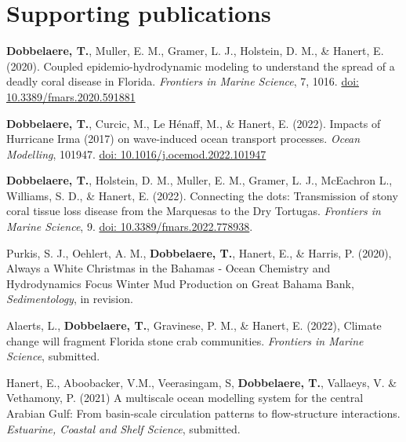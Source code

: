 \newpage
\section*{Supporting publications}

\begin{list}{}{%
    \setlength{\topsep}{0pt}%
    \setlength{\leftmargin}{0.23in}%
    \setlength{\listparindent}{-0.23in}%
    \setlength{\itemindent}{-0.23in}%
    \setlength{\parsep}{\parskip}%
    }%
        
    \item \textbf{Dobbelaere, T.}, Muller, E. M., Gramer, L. J., Holstein, D. M., \& Hanert, E.
    (2020). Coupled epidemio-hydrodynamic modeling to understand the spread
    of a deadly coral disease in Florida. \textit{Frontiers in Marine Science}, 7, 1016. \href{https://www.frontiersin.org/articles/10.3389/fmars.2020.591881/full}{doi: 10.3389/fmars.2020.591881}
    
    \item \textbf{Dobbelaere, T.}, Curcic, M., Le Hénaff, M., \& Hanert, E. (2022). Impacts of Hurricane Irma (2017) on wave-induced ocean transport processes. \textit{Ocean Modelling}, 101947. \href{https://www.sciencedirect.com/science/article/pii/S1463500322000026}{doi: 10.1016/j.ocemod.2022.101947}
    
    \item \textbf{Dobbelaere, T.}, Holstein, D. M., Muller, E. M., Gramer, L. J., McEachron L., Williams, S. D., \& Hanert, E. (2022). Connecting the dots: Transmission of stony coral tissue loss disease from the Marquesas to the Dry Tortugas. \textit{Frontiers in Marine Science}, 9. \href{https://www.frontiersin.org/article/10.3389/fmars.2022.778938}{doi: 10.3389/fmars.2022.778938}.
    
    \item Purkis, S. J., Oehlert, A. M., \textbf{Dobbelaere, T.}, Hanert, E., \& Harris, P. (2020), Always a White Christmas in the Bahamas - Ocean Chemistry and Hydrodynamics Focus Winter Mud Production on Great Bahama Bank, \textit{Sedimentology}, in revision.
    
    \item Alaerts, L., \textbf{Dobbelaere, T.}, Gravinese, P. M., \& Hanert, E. (2022), Climate change will fragment Florida stone crab communities. \textit{Frontiers in Marine Science}, submitted.
    
    \item Hanert, E., Aboobacker, V.M., Veerasingam, S, \textbf{Dobbelaere, T.}, Vallaeys, V. \&
    Vethamony, P. (2021) A multiscale ocean modelling system for the central Arabian Gulf: From basin-scale circulation patterns to flow-structure interactions. \textit{Estuarine, Coastal and Shelf Science}, submitted.
    

\end{list}
